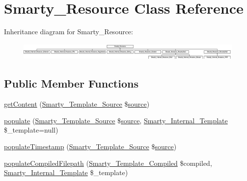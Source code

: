 \hypertarget{class_smarty___resource}{}\section{Smarty\+\_\+\+Resource Class Reference}
\label{class_smarty___resource}
Inheritance diagram for Smarty\+\_\+\+Resource\+:\begin{figure}[H]
\begin{center}
\leavevmode
\includegraphics[height=0.889831cm]{class_smarty___resource}
\end{center}
\end{figure}
\subsection*{Public Member Functions}
\begin{DoxyCompactItemize}
\item 
\hyperlink{class_smarty___resource_a0e40116a3d4f59cf7ea39f83441169b8}{get\+Content} (\hyperlink{class_smarty___template___source}{Smarty\+\_\+\+Template\+\_\+\+Source} \$\hyperlink{class_smarty___resource_ab6ac6b66dac2da6c41a178102f7d53e4}{source})
\item 
\hyperlink{class_smarty___resource_a07a771f460d625d63fcb72d0aeed0b01}{populate} (\hyperlink{class_smarty___template___source}{Smarty\+\_\+\+Template\+\_\+\+Source} \$\hyperlink{class_smarty___resource_ab6ac6b66dac2da6c41a178102f7d53e4}{source}, \hyperlink{class_smarty___internal___template}{Smarty\+\_\+\+Internal\+\_\+\+Template} \$\+\_\+template=null)
\item 
\hyperlink{class_smarty___resource_a0935298de0f84d80fdb2ec7c9c52a763}{populate\+Timestamp} (\hyperlink{class_smarty___template___source}{Smarty\+\_\+\+Template\+\_\+\+Source} \$\hyperlink{class_smarty___resource_ab6ac6b66dac2da6c41a178102f7d53e4}{source})
\item 
\hyperlink{class_smarty___resource_a86942e3e87336b2ffea8a520eeae8428}{populate\+Compiled\+Filepath} (\hyperlink{class_smarty___template___compiled}{Smarty\+\_\+\+Template\+\_\+\+Compiled} \$compiled, \hyperlink{class_smarty___internal___template}{Smarty\+\_\+\+Internal\+\_\+\+Template} \$\+\_\+template)
\end{DoxyCompactItemize}
